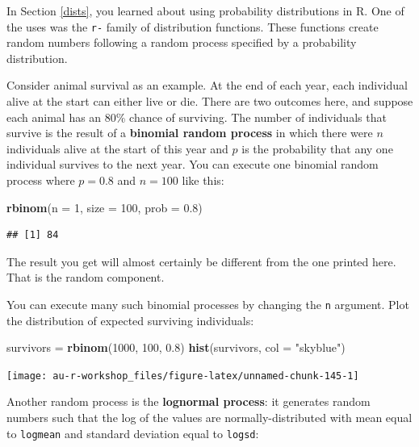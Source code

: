 \documentclass[]{book}
\newenvironment{Shaded}{\begin{snugshade}}{\end{snugshade}}
\newcommand{\KeywordTok}[1]{\textcolor[rgb]{0.13,0.29,0.53}{\textbf{#1}}}
\newcommand{\DataTypeTok}[1]{\textcolor[rgb]{0.13,0.29,0.53}{#1}}
\newcommand{\DecValTok}[1]{\textcolor[rgb]{0.00,0.00,0.81}{#1}}
\newcommand{\FloatTok}[1]{\textcolor[rgb]{0.00,0.00,0.81}{#1}}
\newcommand{\StringTok}[1]{\textcolor[rgb]{0.31,0.60,0.02}{#1}}
\newcommand{\NormalTok}[1]{#1}
\theoremstyle{definition}
\theoremstyle{definition}
\theoremstyle{definition}
\theoremstyle{remark}
\begin{document}
In Section \ref{dists}, you learned about using probability
distributions in R. One of the uses was the \texttt{r-} family of
distribution functions. These functions create random numbers following
a random process specified by a probability distribution.

Consider animal survival as an example. At the end of each year, each
individual alive at the start can either live or die. There are two
outcomes here, and suppose each animal has an 80\% chance of surviving.
The number of individuals that survive is the result of a
\textbf{binomial random process} in which there were \(n\) individuals
alive at the start of this year and \(p\) is the probability that any
one individual survives to the next year. You can execute one binomial
random process where \(p = 0.8\) and \(n = 100\) like this:

\begin{Shaded}
\begin{Highlighting}[]
\KeywordTok{rbinom}\NormalTok{(}\DataTypeTok{n =} \DecValTok{1}\NormalTok{, }\DataTypeTok{size =} \DecValTok{100}\NormalTok{, }\DataTypeTok{prob =} \FloatTok{0.8}\NormalTok{)}
\end{Highlighting}
\end{Shaded}

\begin{verbatim}
## [1] 84
\end{verbatim}

The result you get will almost certainly be different from the one
printed here. That is the random component.

You can execute many such binomial processes by changing the \texttt{n}
argument. Plot the distribution of expected surviving individuals:

\begin{Shaded}
\begin{Highlighting}[]
\NormalTok{survivors =}\StringTok{ }\KeywordTok{rbinom}\NormalTok{(}\DecValTok{1000}\NormalTok{, }\DecValTok{100}\NormalTok{, }\FloatTok{0.8}\NormalTok{)}
\KeywordTok{hist}\NormalTok{(survivors, }\DataTypeTok{col =} \StringTok{"skyblue"}\NormalTok{)}
\end{Highlighting}
\end{Shaded}

\begin{center}\texttt{[image: au-r-workshop\_files/figure-latex/unnamed-chunk-145-1]} \end{center}

Another random process is the \textbf{lognormal process}: it generates
random numbers such that the log of the values are normally-distributed
with mean equal to \texttt{logmean} and standard deviation equal to
\texttt{logsd}:
\end{document}
